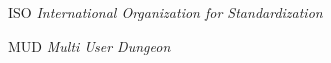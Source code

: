 \begin{siglas}
  \item[ISO] \textit{International Organization for Standardization}
  \item[MUD] \textit{Multi User Dungeon}
\end{siglas}
